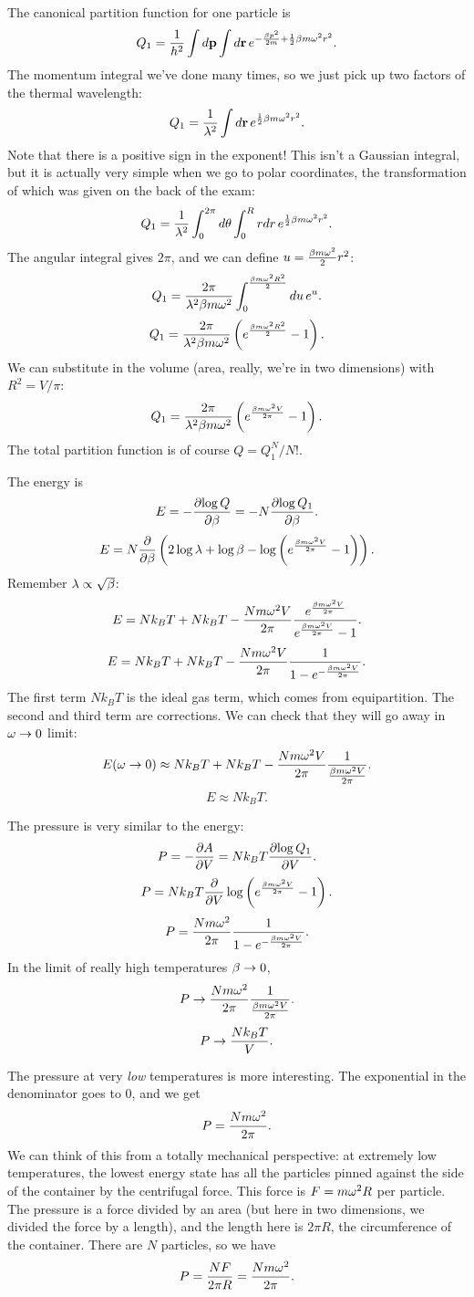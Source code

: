 \documentclass[12pt]{article}
\begin{document}
\hrulefill

 The canonical partition function for one particle is
\[ Q_1 = \frac{1}{h^2} \int d\mathbf{p} \int d\mathbf{r} \, e^{-\frac{\beta p^2}{2m} + \frac{1}{2}\beta m\omega^2 r^2}.\]
The momentum integral we've done many times, so we just pick up two factors of the thermal wavelength:
\[ Q_1 = \frac{1}{\lambda^2} \int d\mathbf{r} \, e^{\frac{1}{2}\beta m \omega^2 r^2}.\]
Note that there is a positive sign in the exponent! This isn't a Gaussian integral, but it is actually very simple when we go to polar coordinates, the transformation of which was given on the back of the exam:
\[ Q_1 = \frac{1}{\lambda^2} \int_0^{2\pi}d\theta \int_0^R rdr \, e^{\frac{1}{2} \beta m \omega^2 r^2}.\]
The angular integral gives $2\pi$, and we can define $u = \frac{\beta m \omega^2}{2}r^2$:
\[ Q_1 = \frac{2\pi}{\lambda^2 \beta m \omega^2} \int_0^{\frac{\beta m \omega^2 R^2}{2}} du \, e^{u}.\]
\[ Q_1 = \frac{2\pi}{\lambda^2\beta m \omega^2} \left(e^{\frac{\beta m \omega^2 R^2}{2}} - 1\right).\]
We can substitute in the volume (area, really, we're in two dimensions) with $R^2 = V/\pi$:
\[ Q_1 = \frac{2\pi}{\lambda^2\beta m \omega^2} \left(e^{\frac{\beta m \omega^2 V}{2\pi}} - 1\right).\]
The total partition function is of course $Q = Q_1^N/N!$.

 The energy is
\[ E = -\frac{\partial {\log Q}}{\partial {\beta}} = -N \frac{\partial {\log Q_1}}{\partial {\beta}}.\]
\[ E = N\frac{\partial {}}{\partial {\beta}}\left( 2\log \lambda + \log \beta - \log \left(e^{\frac{\beta m \omega^2 V}{2\pi}} - 1\right) \right).\]
Remember $\lambda \propto \sqrt{\beta}$:
\[ E = Nk_BT + Nk_BT - \frac{N m \omega^2 V}{2\pi} \frac{e^{\frac{\beta m \omega^2V}{2\pi}} }{e^{\frac{\beta m \omega^2V}{2\pi}}  - 1}.\]
\[ E = Nk_BT + Nk_BT - \frac{N m \omega^2 V}{2\pi} \frac{1}{1-e^{-\frac{\beta m \omega^2V}{2\pi}} }.\]
The first term $Nk_BT$ is the ideal gas term, which comes from equipartition. The second and third term are corrections. We can check that they will go away in $\omega\rightarrow 0$ limit:
\[ E(\omega\rightarrow 0) \approx Nk_BT + Nk_BT - \frac{N m \omega^2 V}{2\pi} \frac{1}{\frac{\beta m \omega^2V}{2\pi}}.\]
\[ E \approx Nk_BT.\]

 The pressure is very similar to the energy:
\[ P = -\frac{\partial {A}}{\partial {V}} = Nk_BT\frac{\partial {\log Q_1}}{\partial {V}}.\]
\[ P = Nk_BT \frac{\partial {}}{\partial {V}} \log \left( e^{\frac{\beta m \omega^2 V}{2\pi}} -1 \right).\]
\[ P = \frac{Nm \omega^2}{2\pi}  \frac{1}{1-e^{-\frac{\beta m \omega^2V}{2\pi}} }.\]
In the limit of really high temperatures $\beta\rightarrow 0$,
\[ P \rightarrow \frac{N m \omega^2} {2\pi} \frac{1}{\frac{\beta m \omega^2V}{2\pi} }.\]
\[ P \rightarrow \frac{Nk_BT}{V}.\]

  The pressure at very \emph{low} temperatures is more interesting. The exponential in the denominator goes to 0, and we get
\[ P = \frac{N m \omega^2}{2\pi}.\]
We can think of this from a totally mechanical perspective: at extremely low temperatures, the lowest energy state has all the particles pinned against the side of the container by the centrifugal force. This force is $F = m \omega^2 R$ per particle. The pressure is a force divided by an area (but here in two dimensions, we divided the force by a length), and the length here is $2\pi R$, the circumference of the container. There are $N$ particles, so we have
\[ P = \frac{ N F}{2\pi R} = \frac{N m \omega^2}{2\pi}.\]
\end{document}
